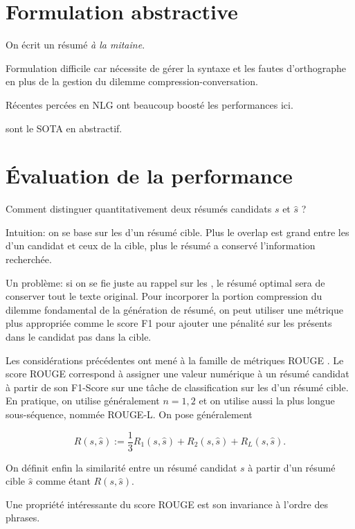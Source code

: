 \section{Formulation abstractive}

On écrit un résumé \textit{à la mitaine}.

Formulation difficile car nécessite de gérer la syntaxe et les fautes
d'orthographe en plus de la gestion du dilemme compression-conversation.

Récentes percées en NLG ont beaucoup boosté les performances ici.

\citep{2020t5, unilm, zhang2019pegasus} sont le SOTA en abstractif.

\section{Évaluation de la performance}

Comment distinguer quantitativement deux résumés candidats $s$ et $\hat{s}$ ?

Intuition: on se base sur les \ngrams d'un résumé cible. Plus le overlap
est grand entre les \ngrams d'un candidat et ceux de la cible, plus le résumé
a conservé l'information recherchée.

Un problème: si on se fie juste au rappel sur les \ngrams, le résumé optimal sera
de conserver tout le texte original. Pour incorporer la portion compression du dilemme
fondamental de la génération de résumé, on peut utiliser une métrique plus
appropriée comme le score F1 pour ajouter une pénalité sur les \ngrams présents dans
le candidat pas dans la cible.

Les considérations précédentes ont mené à la famille de métriques ROUGE \citep{lin-2004-rouge}.
Le score ROUGE correspond à assigner une valeur numérique à un résumé candidat à partir
de son F1-Score sur une tâche de classification sur les \ngrams d'un résumé cible.
En pratique, on utilise généralement $n={1,2}$ et on utilise aussi la plus longue
sous-séquence, nommée ROUGE-L.
On pose généralement

\begin{equation}
    \label{eq:ROUGE}
    R(s, \hat{s}) := \frac{1}{3} R_1(s, \hat{s}) + R_2(s, \hat{s}) + R_L(s, \hat{s}).
\end{equation}

On définit enfin la similarité entre un résumé candidat $s$ à partir d'un résumé cible $\hat{s}$
comme étant $R(s, \hat{s})$.

Une propriété intéressante du score ROUGE est son invariance à
l'ordre des phrases.

